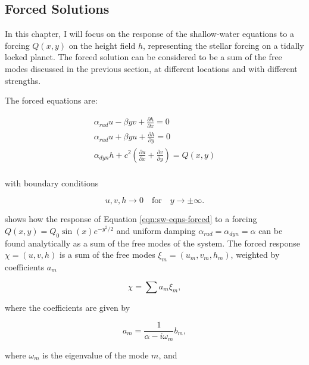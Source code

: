 \subsection{Forced Solutions}

In this chapter, I will focus on the response of the shallow-water equations to a forcing $Q(x,y)$ on the height field $h$, representing the stellar forcing on a tidally locked planet. The forced solution can be considered to be a sum of the free modes discussed in the previous section, at different locations and with different strengths.

The forced equations are:

\begin{equation}\label{eqn:sw-eqns-forced}
  \begin{gathered}
    \alpha_{rad} u - \beta y v +\frac{\partial h}{\partial x} = 0 \\
    \alpha_{rad} u + \beta y u + \frac{\partial h}{\partial y} = 0 \\
    \alpha_{dyn} h + c^{2}(\frac{\partial u}{\partial x} + \frac{\partial v}{\partial y}) = Q(x,y) \\
  \end{gathered}
\end{equation}

with boundary conditions

\begin{equation}
  u , v , h \rightarrow 0 \quad \mathrm{for} \quad y \rightarrow \pm \infty.
\end{equation}

\citet{matsuno1966quasi} shows how the response of Equation \ref{eqn:sw-eqns-forced} to a forcing $Q(x,y) = Q_{0} \sin(x) e^{-y^{2}/2}$ and uniform damping $\alpha_{rad}=\alpha_{dyn}=\alpha$ can be found analytically as a sum of the free modes of the system. The forced response $\chi = (u,v,h)$ is a sum of the free modes $\xi_{m}=(u_{m},v_{m},h_{m})$, weighted by coefficients $a_{m}$

\begin{equation}
  \chi = \sum a _ { m } \xi _ { m },
\end{equation}

where the coefficients are given by

\begin{equation}
  a _ { m } = \frac { 1 } { \alpha - i \omega _ { m } } b _ { m },
\end{equation}

where $\omega_{m}$ is the eigenvalue of the mode $m$, and

